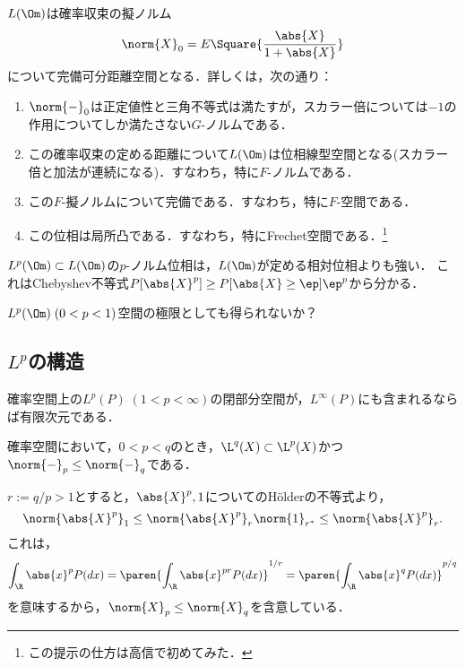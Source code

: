 \documentclass[uplatex,dvipdfmx]{jsreport}
\begin{document}
\begin{theorem}
    $L(\Om)$は確率収束の擬ノルム
    \[\norm{X}_0=E\Square{\frac{\abs{X}}{1+\abs{X}}}\]
    について完備可分距離空間となる．詳しくは，次の通り：
    \begin{enumerate}
        \item $\norm{-}_0$は正定値性と三角不等式は満たすが，スカラー倍については$-1$の作用についてしか満たさない$G$-ノルムである．
        \item この確率収束の定める距離について$L(\Om)$は位相線型空間となる(スカラー倍と加法が連続になる)．すなわち，特に$F$-ノルムである．
        \item この$F$-擬ノルムについて完備である．すなわち，特に$F$-空間である．
        \item この位相は局所凸である．すなわち，特にFrechet空間である．\footnote{この提示の仕方は高信\cite{高信敏}で初めてみた．}
    \end{enumerate}
\end{theorem}
\begin{remarks}
    $L^p(\Om)\subset L(\Om)$の$p$-ノルム位相は，$L(\Om)$が定める相対位相よりも強い．
    これはChebyshev不等式$P[\abs{X}^p]\ge P[\abs{X}\ge\ep]\ep^p$から分かる．
\end{remarks}
\begin{remark}
    $L^p(\Om)\;(0<p<1)$空間の極限としても得られないか？
\end{remark}

\subsection{$L^p$の構造}

\begin{theorem}
    確率空間上の$L^p(P)\;(1<p<\infty)$の閉部分空間が，$L^\infty(P)$にも含まれるならば有限次元である．
\end{theorem}

\begin{theorem}[Lyapunovの不等式]
    確率空間において，$0<p<q$のとき，$\L^q(X)\subset\L^p(X)$かつ$\norm{-}_p\le\norm{-}_q$である．
\end{theorem}
\begin{Proof}
    $r:=q/p>1$とすると，$\abs{X}^p,1$についてのHölderの不等式より，
    \[\norm{\abs{X}^p}_1\le\norm{\abs{X}^p}_r\norm{1}_{r^*}\le\norm{\abs{X}^p}_r.\]
    これは，
    \[\int_\R \abs{x}^pP(dx)=\paren{\int_\R\abs{x}^{pr}P(dx)}^{1/r}=\paren{\int_\R\abs{x}^qP(dx)}^{p/q}\]
    を意味するから，$\norm{X}_p\le\norm{X}_q$を含意している．
\end{Proof}
\end{document}

